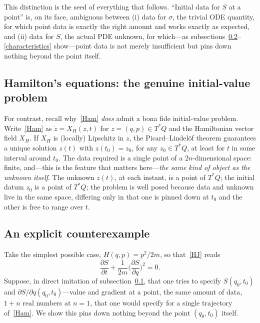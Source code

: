 This distinction is the seed of everything that follows. ``Initial data for $S$
at a point'' is, on its face, ambiguous between (i) data for $\sigma$, the
trivial ODE quantity, for which point data is exactly the right amount and
works exactly as expected, and (ii) data for $S$, the actual PDE unknown, for
which---as subsections~\ref{counterexample}--\ref{characteristics} show---point
data is not merely insufficient but pins down nothing beyond the point itself.

\subsection{Hamilton's equations: the genuine initial-value problem}
\label{ham-ivp}

For contrast, recall why~\eqref{Ham} \emph{does} admit a bona fide
initial-value problem. Write~\eqref{Ham} as $\dot z = X_H(z,t)$ for $z=(q,p)\in
T^*Q$ and the Hamiltonian vector field $X_H$. If $X_H$ is (locally) Lipschitz
in $z$, the Picard--Lindel\"of theorem guarantees a unique solution $z(t)$ with
$z(t_0)=z_0$, for any $z_0\in T^*Q$, at least for $t$ in some interval around
$t_0$. The data required is a single point of a $2n$-dimensional space: finite,
and---this is the feature that matters here---\emph{the same kind of object as
the unknown itself}. The unknown $z(t)$, at each instant, is a point of $T^*Q$;
the initial datum $z_0$ is a point of $T^*Q$; the problem is well posed because
data and unknown live in the same space, differing only in that one is pinned
down at $t_0$ and the other is free to range over $t$.

\subsection{An explicit counterexample}
\label{counterexample}

Take the simplest possible case, $H(q,p)=p^2/2m$, so that~\eqref{HJ} reads
\begin{equation}
\label{HJ-free}
\frac{\partial S}{\partial t} + \frac{1}{2m}\Big(\frac{\partial S}{\partial q}\Big)^{\!2} = 0 .
\end{equation}
Suppose, in direct imitation of subsection~\ref{ham-ivp}, that one tries to
specify $S(q_0,t_0)$ and $\partial S/\partial q(q_0,t_0)$---value and gradient
at a point, the same amount of data, $1+n$ real numbers at $n=1$, that one
would specify for a single trajectory of~\eqref{Ham}. We show this pins down
nothing beyond the point $(q_0,t_0)$ itself.

